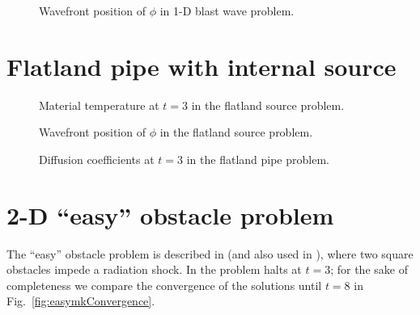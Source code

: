 \begin{figure}[htb]
  \centering\small
  
  \caption{Wavefront position of $\phi$ in 1-D blast wave problem.}
  \label{fig:1dblastWavefront}
\end{figure}

\section{Flatland pipe with internal source}

\begin{figure}[htb]
  \centering\small
  \caption{Material temperature at $t=3$ in the flatland source problem.}
  \label{fig:crashaltMattemp}
\end{figure}

\begin{figure}[htb]
  \centering\small
  
  \caption{Wavefront position of $\phi$ in the flatland source problem.}
  \label{fig:crashaltWavefront}
\end{figure}


\begin{figure}[htb]
  \centering\small
  \caption{Diffusion coefficients at $t=3$ in the flatland pipe problem.}
  \label{fig:crashaltDcoeff}
\end{figure}


\section{2-D \texorpdfstring{``easy''}{easy} obstacle problem}
The ``easy'' obstacle problem is described in \cite{Mou2006} (and also used in
\cite{Kno2007}), where two square obstacles impede a radiation shock. In
\cite{Mou2006} the problem halts at $t=3$; for the sake of completeness we
compare the convergence of the solutions until $t=8$ in
Fig.~\ref{fig:easymkConvergence}.

